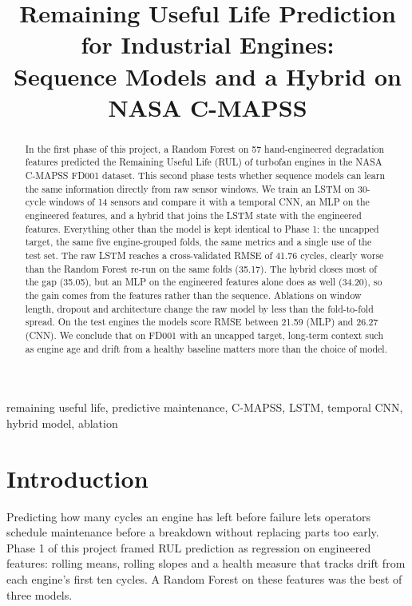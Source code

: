 \documentclass[conference]{IEEEtran}
\begin{document}
\title{Remaining Useful Life Prediction for Industrial Engines:\\
Sequence Models and a Hybrid on NASA C-MAPSS}

\author{
}

\maketitle

\begin{abstract}
In the first phase of this project, a Random Forest on 57 hand-engineered degradation features predicted the Remaining Useful Life (RUL) of turbofan engines in the NASA C-MAPSS FD001 dataset. This second phase tests whether sequence models can learn the same information directly from raw sensor windows. We train an LSTM on 30-cycle windows of 14 sensors and compare it with a temporal CNN, an MLP on the engineered features, and a hybrid that joins the LSTM state with the engineered features. Everything other than the model is kept identical to Phase 1: the uncapped target, the same five engine-grouped folds, the same metrics and a single use of the test set. The raw LSTM reaches a cross-validated RMSE of 41.76 cycles, clearly worse than the Random Forest re-run on the same folds (35.17). The hybrid closes most of the gap (35.05), but an MLP on the engineered features alone does as well (34.20), so the gain comes from the features rather than the sequence. Ablations on window length, dropout and architecture change the raw model by less than the fold-to-fold spread. On the test engines the models score RMSE between 21.59 (MLP) and 26.27 (CNN). We conclude that on FD001 with an uncapped target, long-term context such as engine age and drift from a healthy baseline matters more than the choice of model.
\end{abstract}

\begin{IEEEkeywords}
remaining useful life, predictive maintenance, C-MAPSS, LSTM, temporal CNN, hybrid model, ablation
\end{IEEEkeywords}

\section{Introduction}
Predicting how many cycles an engine has left before failure lets operators schedule maintenance before a breakdown without replacing parts too early. Phase 1 of this project framed RUL prediction as regression on engineered features: rolling means, rolling slopes and a health measure that tracks drift from each engine's first ten cycles. A Random Forest on these features was the best of three models.
\end{document}

